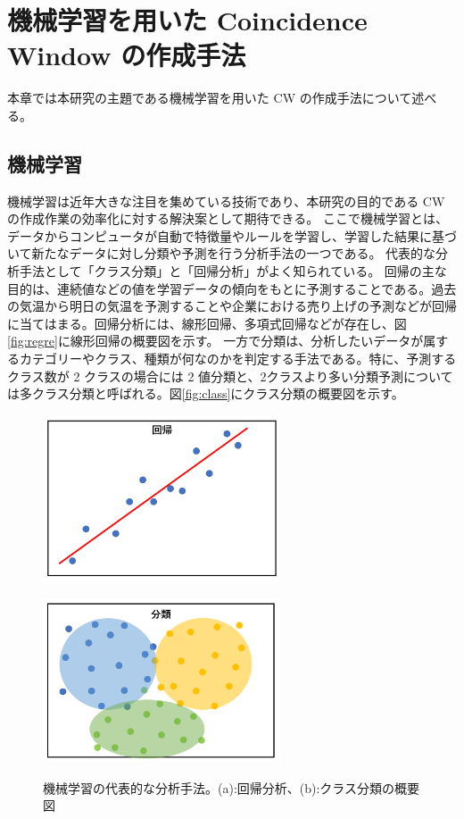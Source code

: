 \chapter{機械学習を用いた Coincidence Window の作成手法}\label{chapter4}
本章では本研究の主題である機械学習を用いた CW の作成手法について述べる。

\section{機械学習}\label{回帰分析}
機械学習は近年大きな注目を集めている技術であり、本研究の目的である CW の作成作業の効率化に対する解決案として期待できる。
ここで機械学習とは、データからコンピュータが自動で特徴量やルールを学習し、学習した結果に基づいて新たなデータに対し分類や予測を行う分析手法の一つである。
代表的な分析手法として「クラス分類」と「回帰分析」がよく知られている。
回帰の主な目的は、連続値などの値を学習データの傾向をもとに予測することである。過去の気温から明日の気温を予測することや企業における売り上げの予測などが回帰に当てはまる。回帰分析には、線形回帰、多項式回帰などが存在し、図\ref{fig:regre}に線形回帰の概要図を示す。
一方で分類は、分析したいデータが属するカテゴリーやクラス、種類が何なのかを判定する手法である。特に、予測するクラス数が 2 クラスの場合には 2 値分類と、2クラスより多い分類予測については多クラス分類と呼ばれる。図\ref{fig:class}にクラス分類の概要図を示す。
\begin{figure}[tb]
  \centering
    \begin{minipage}[b]{0.4\linewidth}
        \centering
        \includegraphics[clip, width=7cm]{fig/4/regression.png}
        \vspace{10pt}
        \subcaption{}
        \label{fig:regre}
    \end{minipage}
    \hfill
    \begin{minipage}[b]{0.4\linewidth}
        \centering
        \includegraphics[clip, width=7cm]{fig/4/classification.png}
        \vspace{10pt}
        \subcaption{}
        \label{fig:class}
    \end{minipage}
  \caption{機械学習の代表的な分析手法。(a):回帰分析、(b):クラス分類の概要図}
  \label{fig:fit_def}
\end{figure}

